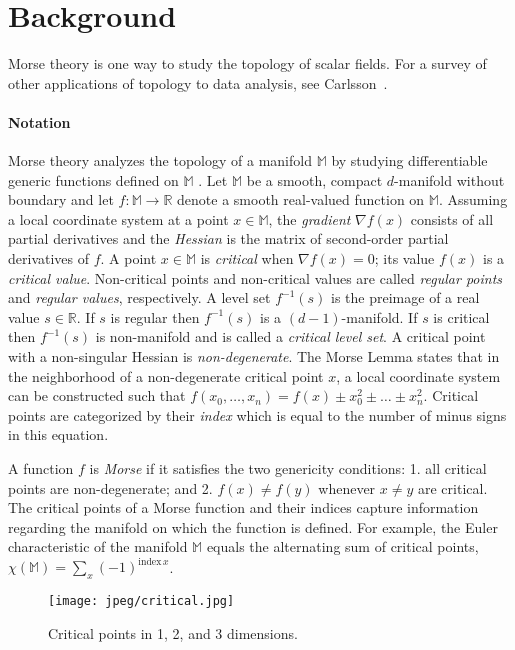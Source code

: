 \section{Background}
\label{sec:background}

Morse theory is one way to study the topology of scalar fields.
For a survey of other applications of topology to data analysis, see
Carlsson~\cite{car09}.

\paragraph{Notation}
Morse theory analyzes the topology of a manifold  $\mathbb{M}$ by studying
differentiable generic functions defined on $\mathbb{M}$
\cite{Milnor:Morse,Matsumoto:Morse}.  Let $\mathbb{M}$ be a smooth, compact
$d$-manifold without boundary and let $f:\mathbb{M}\rightarrow \mathbb{R}$
denote a smooth real-valued function on $\mathbb{M}$.  Assuming a local
coordinate system at a point $x\in\mathbb{M}$, the \emph{gradient} $\nabla
f(x)$ consists of all partial derivatives and the \emph{Hessian} is the matrix
of second-order partial derivatives of $f$.  A point $x\in\mathbb{M}$ is
\emph{critical} when $\nabla f(x)=0$; its value $f(x)$ is a \emph{critical
value}.  Non-critical points and non-critical values are called \emph{regular
points} and \emph{regular values}, respectively.  A level set $f^{-1}(s)$ is
the preimage of a real value $s\in\mathbb{R}$.  If $s$ is regular then 
$f^{-1}(s)$ is a $(d-1)$-manifold.  If $s$ is critical then $f^{-1}(s)$ 
is non-manifold and is called a \emph{critical level set}. 
A critical point with a non-singular Hessian is \emph{non-degenerate}.  
The Morse Lemma states that in the neighborhood of a
non-degenerate critical point $x$, a local coordinate system can be constructed
such that $f(x_0,\ldots, x_n) = f(x) \pm x_0^2 \pm \ldots \pm x_n^2$.  Critical
points are categorized by their \emph{index} which is equal to the number of
minus signs in this equation.  

A function $f$ is \emph{Morse} if it satisfies the two genericity conditions:
1. all critical points are non-degenerate; and 2. $f(x) \ne f(y)$ whenever $x \ne y$ are critical.
The critical points of a Morse function and their indices capture information
regarding the manifold on which the function is defined. For example, the Euler
characteristic of the manifold $\mathbb{M}$ equals the alternating sum of critical
points, $\chi(\mathbb{M}) = \sum_x(-1)^{\mathrm{index}\,x}$.

\begin{figure}[ht]
  \center
  \texttt{[image: jpeg/critical.jpg]} 
  \caption{Critical points in 1, 2, and 3 dimensions.}
  \label{fig:critical}
\end{figure}

